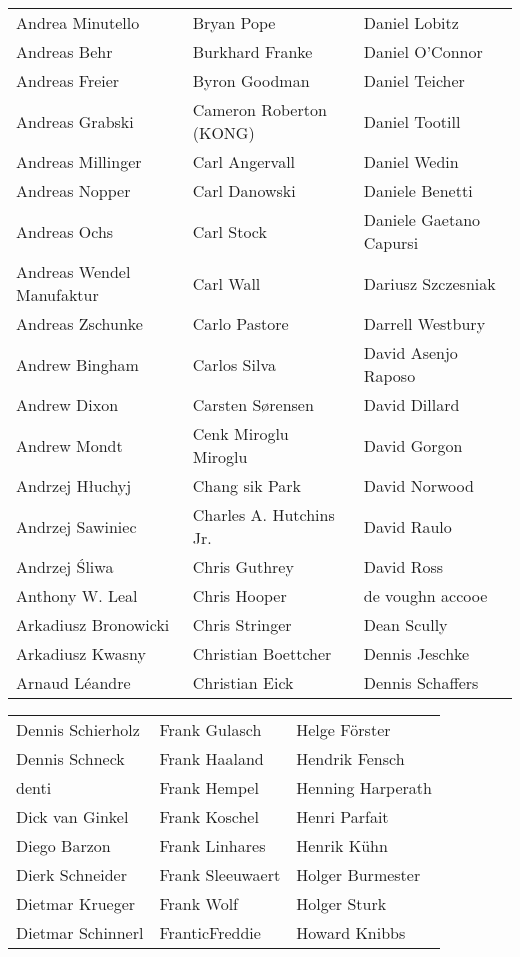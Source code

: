 \begin{small}
\begin{tabular}{p{4cm}p{4cm}p{4cm}}
Andrea Minutello & Bryan Pope & Daniel Lobitz \\
Andreas Behr & Burkhard Franke & Daniel O'Connor \\
Andreas Freier & Byron Goodman & Daniel Teicher \\
Andreas Grabski & Cameron Roberton (KONG) & Daniel Tootill \\
Andreas Millinger & Carl Angervall & Daniel Wedin \\
Andreas Nopper & Carl Danowski & Daniele Benetti \\
Andreas Ochs & Carl Stock & Daniele Gaetano Capursi \\
Andreas Wendel Manufaktur & Carl Wall & Dariusz Szczesniak \\
Andreas Zschunke & Carlo Pastore & Darrell Westbury \\
Andrew Bingham & Carlos Silva & David Asenjo Raposo \\
Andrew Dixon & Carsten Sørensen & David Dillard \\
Andrew Mondt & Cenk Miroglu Miroglu & David Gorgon \\
Andrzej Hłuchyj & Chang sik Park & David Norwood \\
Andrzej Sawiniec & Charles A. Hutchins Jr. & David Raulo \\
Andrzej Śliwa & Chris Guthrey & David Ross \\
Anthony W. Leal & Chris Hooper & de voughn accooe \\
Arkadiusz Bronowicki & Chris Stringer & Dean Scully \\
Arkadiusz Kwasny & Christian Boettcher & Dennis Jeschke \\
Arnaud Léandre & Christian Eick & Dennis Schaffers \\
\end{tabular}
\newpage
\setlength{\tabcolsep}{1mm}
\begin{tabular}{p{4cm}p{4cm}p{4cm}}
Dennis Schierholz & Frank Gulasch & Helge Förster \\
Dennis Schneck & Frank Haaland & Hendrik Fensch \\
denti & Frank Hempel & Henning Harperath \\
Dick van Ginkel & Frank Koschel & Henri Parfait \\
Diego Barzon & Frank Linhares & Henrik Kühn \\
Dierk Schneider & Frank Sleeuwaert & Holger Burmester \\
Dietmar Krueger & Frank Wolf & Holger Sturk \\
Dietmar Schinnerl & FranticFreddie & Howard Knibbs \\

\end{tabular}
\end{small}
